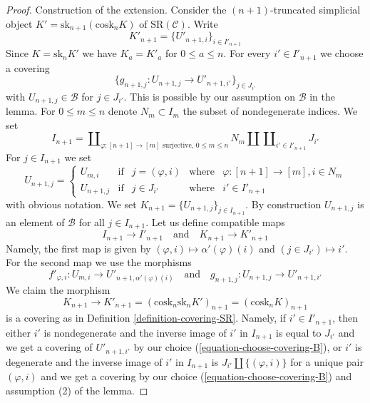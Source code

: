 \documentclass[10pt,a4paper]{article}
\theoremstyle{plain}
\theoremstyle{definition}
\theoremstyle{remark}
\numberwithin{equation}{subsection}
\begin{document}
\begin{proof}
\medskip\noindent
Construction of the extension. Consider the $(n + 1)$-truncated simplicial
object $K' = \text{sk}_{n + 1}(\text{cosk}_n K)$ of $\text{SR}(\mathcal{C})$.
Write
$$
K'_{n + 1} = \{U'_{n + 1, i}\}_{i \in I'_{n + 1}}
$$
Since $K = \text{sk}_n K'$ we have $K_a = K'_a$ for $0 \leq a \leq n$.
For every $i' \in I'_{n + 1}$ we choose a covering
\begin{equation}
\label{equation-choose-covering-B}
\{g_{n + 1, j} : U_{n + 1, j} \to U'_{n + 1, i'}\}_{j \in J_{i'}}
\end{equation}
with $U_{n + 1, j} \in \mathcal{B}$ for $j \in J_{i'}$.
This is possible by our assumption on $\mathcal{B}$ in the lemma.
For $0 \leq m \leq n$ denote $N_m \subset I_m$ the subset of
nondegenerate indices. We set
$$
I_{n + 1} =
\coprod\nolimits_{\varphi : [n + 1] \to [m]\text{ surjective, }0\leq m \leq n}
N_m \amalg
\coprod\nolimits_{i' \in I'_{n + 1}} J_{i'}
$$
For $j \in I_{n + 1}$ we set
$$
U_{n + 1, j} =
\left\{
\begin{matrix}
U_{m, i} & \text{if} &
j = (\varphi, i) & \text{where} & \varphi : [n + 1] \to [m], i \in N_m \\
U_{n + 1, j} & \text{if} &
j \in J_{i'} & \text{where} & i' \in I'_{n + 1}
\end{matrix}
\right.
$$
with obvious notation. We set $K_{n + 1} = \{U_{n + 1, j}\}_{j \in I_{n + 1}}$.
By construction $U_{n + 1, j}$ is an element
of $\mathcal{B}$ for all $j \in I_{n + 1}$. Let us define compatible
maps
$$
I_{n + 1} \to I'_{n + 1}
\quad\text{and}\quad
K_{n + 1} \to K'_{n + 1}
$$
Namely, the first map is given by
$(\varphi, i) \mapsto \alpha'(\varphi)(i)$ and
$(j \in J_{i'}) \mapsto i'$.
For the second map we use the morphisms
$$
f'_{\varphi, i} : U_{m, i} \to U'_{n + 1, \alpha'(\varphi)(i)}
\quad\text{and}\quad
g_{n + 1, j} : U_{n + 1, j} \to U'_{n + 1, i'}
$$
We claim the morphism
$$
K_{n + 1} \to K'_{n + 1} =
(\text{cosk}_n \text{sk}_n K')_{n + 1} =
(\text{cosk}_n K)_{n + 1}
$$
is a covering as in Definition \ref{definition-covering-SR}.
Namely, if $i' \in I'_{n + 1}$, then either $i'$ is nondegenerate
and the inverse image of $i'$ in $I_{n + 1}$ is equal to $J_{i'}$
and we get a covering of $U'_{n + 1, i'}$ by our choice
(\ref{equation-choose-covering-B}), or $i'$ is degenerate and
the inverse image of $i'$ in $I_{n + 1}$ is
$J_{i'} \amalg \{(\varphi, i)\}$ for a unique pair $(\varphi, i)$
and we get a covering by our choice (\ref{equation-choose-covering-B})
and assumption (2) of the lemma.


\end{proof}
\end{document}
